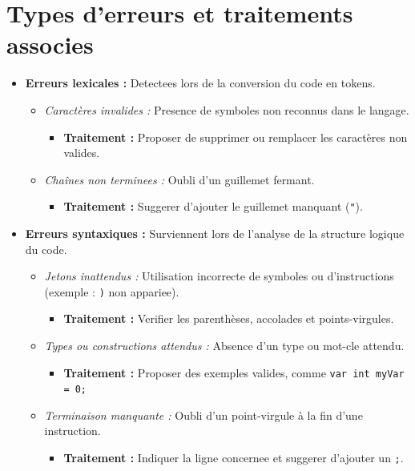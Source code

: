 \documentclass[12pt,a4paper]{report}
\begin{document}
\section{Types d'erreurs et traitements associes}

\begin{itemize}
    \item \textbf{Erreurs lexicales :} Detectees lors de la conversion du code en tokens.
    \begin{itemize}
        \item \textit{Caractères invalides :} Presence de symboles non reconnus dans le langage.
        \begin{itemize}
            \item \textbf{Traitement :} Proposer de supprimer ou remplacer les caractères non valides.
        \end{itemize}
        \item \textit{Chaînes non terminees :} Oubli d'un guillemet fermant.
        \begin{itemize}
            \item \textbf{Traitement :} Suggerer d'ajouter le guillemet manquant (\texttt{"}).\\
        \end{itemize}
    \end{itemize}

    \item \textbf{Erreurs syntaxiques :} Surviennent lors de l'analyse de la structure logique du code.
    \begin{itemize}
        \item \textit{Jetons inattendus :} Utilisation incorrecte de symboles ou d'instructions (exemple : \texttt{)} non appariee).
        \begin{itemize}
            \item \textbf{Traitement :} Verifier les parenthèses, accolades et points-virgules.
        \end{itemize}
        \item \textit{Types ou constructions attendus :} Absence d'un type ou mot-cle attendu.
        \begin{itemize}
            \item \textbf{Traitement :} Proposer des exemples valides, comme \texttt{var int myVar = 0;}
        \end{itemize}
        \item \textit{Terminaison manquante :} Oubli d'un point-virgule à la fin d'une instruction.
        \begin{itemize}
            \item \textbf{Traitement :} Indiquer la ligne concernee et suggerer d'ajouter un \texttt{;}.\\
        \end{itemize}
    \end{itemize}


\end{itemize}
\end{document}
